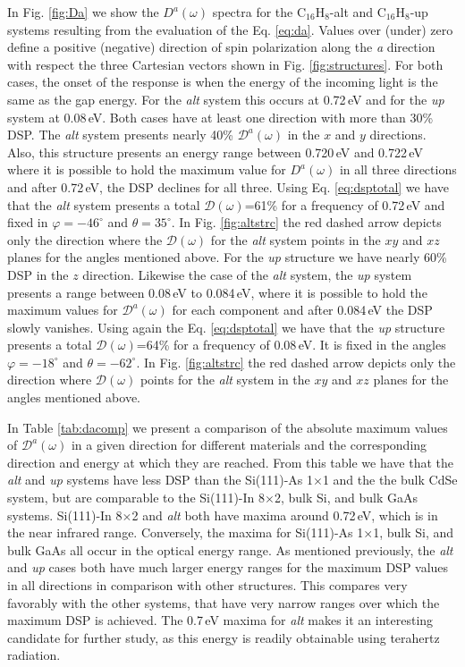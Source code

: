 \documentclass[pss]{wiley2sp} %
\begin{document}
In Fig. \ref{fig:Da} we show the $D^{a}(\omega)$ spectra for the C$_{16}$H$_{8}$-alt and C$_{16}$H$_{8}$-up systems resulting from the evaluation of the Eq. \eqref{eq:da}. Values over (under) zero define a positive (negative) direction of spin polarization along the \emph{a} direction with respect the three Cartesian vectors shown in Fig. \ref{fig:structures}. For both cases, the onset of the response is when the energy of the incoming light is the same as the gap energy. For the \emph{alt} system this occurs at 0.72\,eV and for the \emph{up} system at 0.08\,eV. Both cases have at least one direction with more than 30\% DSP. The \emph{alt} system presents nearly 40\% $\mathcal{D}^{a}(\omega)$ in the $x$ and $y$ directions. Also, this structure presents an energy range between 0.720\,eV and 0.722\,eV where it is possible to hold the maximum value for $D^{a}(\omega)$ in all three directions and after 0.72\,eV, the DSP declines for all three. Using Eq. \eqref{eq:dsptotal} we have that the \emph{alt} system presents a total $\mathcal{D}(\omega)$=61\% for a frequency of 0.72\,eV and fixed in $\varphi=-46^{\circ}$ and $\theta=35^{\circ}$. In Fig. \ref{fig:altstrc} the red dashed arrow depicts only the direction where the $\mathcal{D}(\omega)$ for the \emph{alt} system points in the $xy$ and $xz$ planes for the angles mentioned above. For the \emph{up} structure we have nearly 60\% DSP in the $z$ direction. Likewise the case of the \emph{alt} system, the \emph{up} system presents a range between 0.08\,eV to 0.084\,eV, where it is possible to hold the maximum values for $\mathcal{D}^{a}(\omega)$ for each component and after 0.084\,eV the DSP slowly vanishes. Using again the Eq. \eqref{eq:dsptotal} we have that the \emph{up} structure presents a total $\mathcal{D}(\omega)$=64\% for a frequency of 0.08\,eV. It is fixed in the angles $\varphi=-18^{\circ}$ and $\theta=-62^{\circ}$. In Fig. \ref{fig:altstrc} the red dashed arrow depicts only the direction where $\mathcal{D}(\omega)$ points for the \emph{alt} system in the $xy$ and $xz$  planes for the angles mentioned above. 

In Table \ref{tab:dacomp} we present a comparison of the absolute maximum values of $\mathcal{D}^{a}(\omega)$ in a given direction for different materials and the corresponding direction and energy at which they are reached. From this table we have that the \emph{alt} and \emph{up} systems have less DSP than the Si(111)-As 1$\times$1 and the the bulk CdSe system, but are comparable to the Si(111)-In 8$\times$2, bulk Si, and bulk GaAs systems. Si(111)-In 8$\times$2 and \emph{alt} both have maxima around 0.72\,eV, which is in the near infrared range. Conversely, the maxima for Si(111)-As 1$\times$1, bulk Si, and bulk GaAs all occur in the optical energy range. As mentioned previously, the \emph{alt} and \emph{up} cases both have much larger energy ranges for the maximum DSP values in all directions in comparison with other structures. This compares very favorably with the other systems, that have very narrow ranges over which the maximum DSP is achieved. The 0.7\,eV maxima for \emph{alt} makes it an interesting candidate for further study, as this energy is readily obtainable using terahertz radiation.
\end{document}
